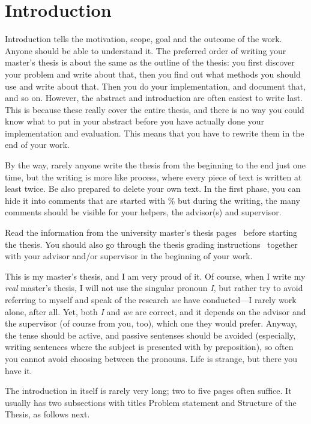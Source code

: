 \chapter{Introduction}
\label{chapter:intro}


Introduction tells the motivation, scope, goal and the outcome of the
work. Anyone should be able to understand it. The preferred order of
writing your master's thesis is about the same as the outline of the
thesis: you first discover your problem and write about that, then you
find out what methods you should use and write about that.  Then you
do your implementation, and document that, and so on.  However, the
abstract and introduction are often easiest to write last.  This is
because these really cover the entire thesis, and there is no way you
could know what to put in your abstract before you have actually done
your implementation and evaluation. This means that you have to
rewrite them in the end of your work.

By the way, rarely anyone write the thesis from the beginning to the
end just one time, but the writing is more like process, where every
piece of text is written at least twice. Be also prepared to delete
your own text. In the first phase, you can hide it into comments that
are started with \% but during the writing, the many comments should
be visible for your helpers, the advisor(s) and supervisor.

Read the information from the university master's thesis
pages~\cite{ThesisInstructions} before starting the thesis.  You
should also go through the thesis grading
instructions~\cite{ThesisGrading} together with your advisor and/or
supervisor in the beginning of your work.

This is my master's thesis, and I am very proud of it.  Of course,
when I write my \emph{real} master's thesis, I will not use the
singular pronoun \emph{I}, but rather try to avoid referring to myself
and speak of the research \emph{we} have conducted---I rarely work
alone, after all.  Yet, both \emph{I} and \emph{we} are correct, and
it depends on the advisor and the supervisor (of course from you,
too), which one they would prefer. Anyway, the tense should be active,
and passive sentenses should be avoided (especially, writing sentences
where the subject is presented with by preposition), so often you
cannot avoid choosing between the pronouns. Life is strange, but there
you have it.

The introduction in itself is rarely very long; two to five pages
often suffice. It usually has two subsections with titles Problem
statement and Structure of the Thesis, as follows next.


